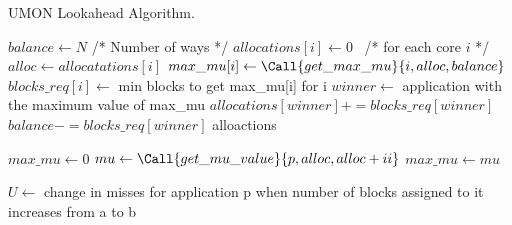 \begin{algorithm}[ht]
\caption{UMON Lookahead Algorithm.}
\label{alg:algorithms:ucp}
\begin{algorithmic}[1]
\State $balance\gets N$ /* Number of ways */
\State $allocations[i]\gets 0$  /* for each core $i$ */
        \State $alloc\gets allocatations[i]$
        \State $max\_mu[i]\gets \Call{get\_max\_mu}{i, alloc, balance}$
        \State $blocks\_req[i]\gets$ min blocks to get max\_mu[i] for i
    \EndFor
    \State $winner\gets$ application with the maximum value of max\_mu
    \State $allocations[winner] += blocks\_req[winner]$
    \State $balance -= blocks\_req[winner]$
\EndWhile
\State \Return alloactions
\State

    \State $max\_mu\gets 0$
        \State $mu\gets \Call{get\_mu\_value}{p, alloc, alloc+ii}$
            \State $max\_mu\gets mu$
        \EndIf
    \EndFor
    \State {}
\EndFunction
\State

    \State $U\gets$ change in misses for application p when number of blocks assigned to it increases from a to b
    \State {}
\EndFunction
\end{algorithmic}
\end{algorithm}



